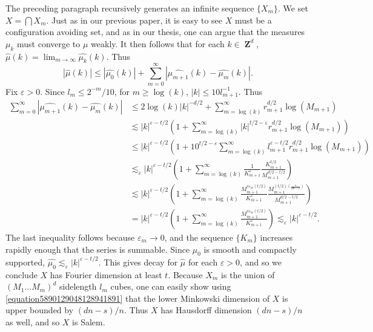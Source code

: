\documentclass[12pt,reqno]{article}
\numberwithin{equation}{section}
\DeclareMathOperator{\ZZ}{\mathbf{Z}}
\begin{document}
The preceding paragraph recursively generates an infinite sequence $\{ X_m \}$. We set $X = \bigcap X_m$. Just as in our previous paper, it is easy to see $X$ must be a configuration avoiding set, and as in our thesis, one can argue that the measures $\mu_k$ must converge to $\mu$ weakly. It then follows that for each $k \in \ZZ^d$, $\widehat{\mu}(k) = \lim_{m \to \infty} \widehat{\mu_k}(k)$. Thus
%
\[ |\widehat{\mu}(k)| \leq |\widehat{\mu_0}(k)| + \sum_{m = 0}^\infty |\widehat{\mu_{m+1}}(k) - \widehat{\mu_m}(k)|. \]
%
Fix $\varepsilon > 0$. Since $l_m \leq 2^{-m}/10$, for $m \geq \log(k)$, $|k| \leq 10 l_{m+1}^{-1}$. Thus
%
\begin{align*}
    \sum_{m = 0}^\infty |\widehat{\mu_{m+1}}(k) - \widehat{\mu_m}(k)| &\leq 2 \log(k) |k|^{-d/2} + \sum_{m = \log(k)}^\infty r_{m+1}^{d/2} \log(M_{m+1})\\
    &\lesssim |k|^{\varepsilon- t/2} \left( 1 + \sum_{m = \log(k)}^\infty |k|^{t/2-\varepsilon} r_{m+1}^{d/2} \log(M_{m+1}) \right)\\
    &\leq |k|^{\varepsilon - t/2} \left( 1 + 10^{t/2 - \varepsilon} \sum_{m = \log(k)}^\infty l_{m+1}^{\varepsilon - t/2} r_{m+1}^{d/2} \log(M_{m+1}) \right)\\
    &\lesssim_\varepsilon |k|^{\varepsilon - t/2} \left( 1 + \sum_{m = \log(k)}^\infty \frac{1}{K_{m+1}^{\varepsilon}} \frac{K_{m+1}^{t/2}}{M_{m+1}^{d/2 - t/2}} \right)\\
    &\lesssim |k|^{\varepsilon - t/2} \left( 1 + \sum_{m = \log(k)}^\infty \frac{M_{m+1}^{c\varepsilon_m (t/2)}}{K_{m+1}^\varepsilon} \frac{M_{m+1}^{(t/2) \left( \frac{s}{dn-s} \right)}}{M_{m+1}^{d/2 - t/2}} \right)\\
    &= |k|^{\varepsilon - t/2} \left( 1 + \sum_{m = \log(k)}^\infty \frac{M_{m+1}^{c\varepsilon_m (t/2)}}{K_{m+1}^{\varepsilon}} \right) \lesssim_\varepsilon |k|^{\varepsilon - t/2}.
\end{align*}
%
The last inequality follows because $\varepsilon_m \to 0$, and the sequence $\{ K_m \}$ increases rapidly enough that the series is summable. Since $\mu_0$ is smooth and compactly supported, $\widehat{\mu_0} \lesssim_\varepsilon |k|^{\varepsilon - t/2}$. This gives decay for $\widehat{\mu}$ for each $\varepsilon > 0$, and so we conclude $X$ has Fourier dimension at least $t$. Because $X_m$ is the union of $(M_1 \dots M_m)^d$ sidelength $l_m$ cubes, one can easily show using \eqref{equation5890129048128941891} that the lower Minkowski dimension of $X$ is upper bounded by $(dn - s)/n$. Thus $X$ has Hausdorff dimension $(dn - s)/n$ as well, and so $X$ is Salem.
\end{document}

